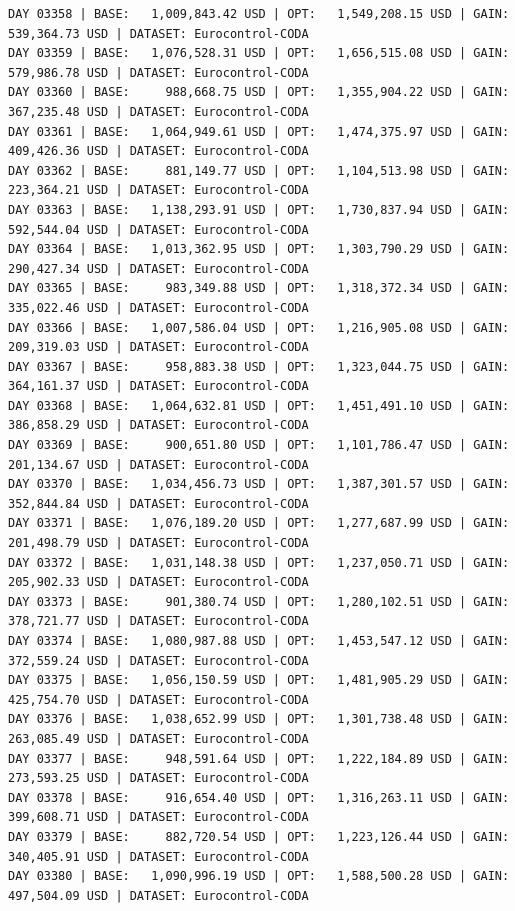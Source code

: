 \documentclass[11pt,a4paper]{article}
\begin{document}
\begin{verbatim}
DAY 03358 | BASE:   1,009,843.42 USD | OPT:   1,549,208.15 USD | GAIN: 539,364.73 USD | DATASET: Eurocontrol-CODA
DAY 03359 | BASE:   1,076,528.31 USD | OPT:   1,656,515.08 USD | GAIN: 579,986.78 USD | DATASET: Eurocontrol-CODA
DAY 03360 | BASE:     988,668.75 USD | OPT:   1,355,904.22 USD | GAIN: 367,235.48 USD | DATASET: Eurocontrol-CODA
DAY 03361 | BASE:   1,064,949.61 USD | OPT:   1,474,375.97 USD | GAIN: 409,426.36 USD | DATASET: Eurocontrol-CODA
DAY 03362 | BASE:     881,149.77 USD | OPT:   1,104,513.98 USD | GAIN: 223,364.21 USD | DATASET: Eurocontrol-CODA
DAY 03363 | BASE:   1,138,293.91 USD | OPT:   1,730,837.94 USD | GAIN: 592,544.04 USD | DATASET: Eurocontrol-CODA
DAY 03364 | BASE:   1,013,362.95 USD | OPT:   1,303,790.29 USD | GAIN: 290,427.34 USD | DATASET: Eurocontrol-CODA
DAY 03365 | BASE:     983,349.88 USD | OPT:   1,318,372.34 USD | GAIN: 335,022.46 USD | DATASET: Eurocontrol-CODA
DAY 03366 | BASE:   1,007,586.04 USD | OPT:   1,216,905.08 USD | GAIN: 209,319.03 USD | DATASET: Eurocontrol-CODA
DAY 03367 | BASE:     958,883.38 USD | OPT:   1,323,044.75 USD | GAIN: 364,161.37 USD | DATASET: Eurocontrol-CODA
DAY 03368 | BASE:   1,064,632.81 USD | OPT:   1,451,491.10 USD | GAIN: 386,858.29 USD | DATASET: Eurocontrol-CODA
DAY 03369 | BASE:     900,651.80 USD | OPT:   1,101,786.47 USD | GAIN: 201,134.67 USD | DATASET: Eurocontrol-CODA
DAY 03370 | BASE:   1,034,456.73 USD | OPT:   1,387,301.57 USD | GAIN: 352,844.84 USD | DATASET: Eurocontrol-CODA
DAY 03371 | BASE:   1,076,189.20 USD | OPT:   1,277,687.99 USD | GAIN: 201,498.79 USD | DATASET: Eurocontrol-CODA
DAY 03372 | BASE:   1,031,148.38 USD | OPT:   1,237,050.71 USD | GAIN: 205,902.33 USD | DATASET: Eurocontrol-CODA
DAY 03373 | BASE:     901,380.74 USD | OPT:   1,280,102.51 USD | GAIN: 378,721.77 USD | DATASET: Eurocontrol-CODA
DAY 03374 | BASE:   1,080,987.88 USD | OPT:   1,453,547.12 USD | GAIN: 372,559.24 USD | DATASET: Eurocontrol-CODA
DAY 03375 | BASE:   1,056,150.59 USD | OPT:   1,481,905.29 USD | GAIN: 425,754.70 USD | DATASET: Eurocontrol-CODA
DAY 03376 | BASE:   1,038,652.99 USD | OPT:   1,301,738.48 USD | GAIN: 263,085.49 USD | DATASET: Eurocontrol-CODA
DAY 03377 | BASE:     948,591.64 USD | OPT:   1,222,184.89 USD | GAIN: 273,593.25 USD | DATASET: Eurocontrol-CODA
DAY 03378 | BASE:     916,654.40 USD | OPT:   1,316,263.11 USD | GAIN: 399,608.71 USD | DATASET: Eurocontrol-CODA
DAY 03379 | BASE:     882,720.54 USD | OPT:   1,223,126.44 USD | GAIN: 340,405.91 USD | DATASET: Eurocontrol-CODA
DAY 03380 | BASE:   1,090,996.19 USD | OPT:   1,588,500.28 USD | GAIN: 497,504.09 USD | DATASET: Eurocontrol-CODA

\end{verbatim}
\end{document}
